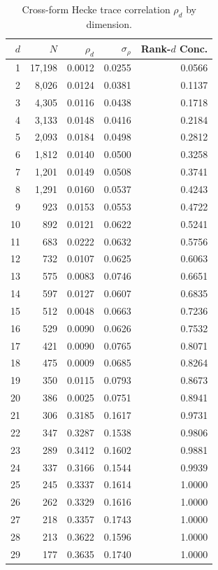 \begin{table}[h]
\centering
\caption{Cross-form Hecke trace correlation $\rho_d$ by dimension.}
\label{tab:galois-correlation}
\begin{tabular}{rrrrr}
\toprule
$d$ & $N$ & $\rho_d$ & $\sigma_{\rho}$ & Rank-$d$ Conc. \\
\midrule
1 & 17,198 & 0.0012 & 0.0255 & 0.0566 \\
2 & 8,026 & 0.0124 & 0.0381 & 0.1137 \\
3 & 4,305 & 0.0116 & 0.0438 & 0.1718 \\
4 & 3,133 & 0.0148 & 0.0416 & 0.2184 \\
5 & 2,093 & 0.0184 & 0.0498 & 0.2812 \\
6 & 1,812 & 0.0140 & 0.0500 & 0.3258 \\
7 & 1,201 & 0.0149 & 0.0508 & 0.3741 \\
8 & 1,291 & 0.0160 & 0.0537 & 0.4243 \\
9 & 923 & 0.0153 & 0.0553 & 0.4722 \\
10 & 892 & 0.0121 & 0.0622 & 0.5241 \\
11 & 683 & 0.0222 & 0.0632 & 0.5756 \\
12 & 732 & 0.0107 & 0.0625 & 0.6063 \\
13 & 575 & 0.0083 & 0.0746 & 0.6651 \\
14 & 597 & 0.0127 & 0.0607 & 0.6835 \\
15 & 512 & 0.0048 & 0.0663 & 0.7236 \\
16 & 529 & 0.0090 & 0.0626 & 0.7532 \\
17 & 421 & 0.0090 & 0.0765 & 0.8071 \\
18 & 475 & 0.0009 & 0.0685 & 0.8264 \\
19 & 350 & 0.0115 & 0.0793 & 0.8673 \\
20 & 386 & 0.0025 & 0.0751 & 0.8941 \\
21 & 306 & 0.3185 & 0.1617 & 0.9731 \\
22 & 347 & 0.3287 & 0.1538 & 0.9806 \\
23 & 289 & 0.3412 & 0.1602 & 0.9881 \\
24 & 337 & 0.3166 & 0.1544 & 0.9939 \\
25 & 245 & 0.3337 & 0.1614 & 1.0000 \\
26 & 262 & 0.3329 & 0.1616 & 1.0000 \\
27 & 218 & 0.3357 & 0.1743 & 1.0000 \\
28 & 213 & 0.3622 & 0.1596 & 1.0000 \\
29 & 177 & 0.3635 & 0.1740 & 1.0000 \\

\end{tabular}
\end{table}
